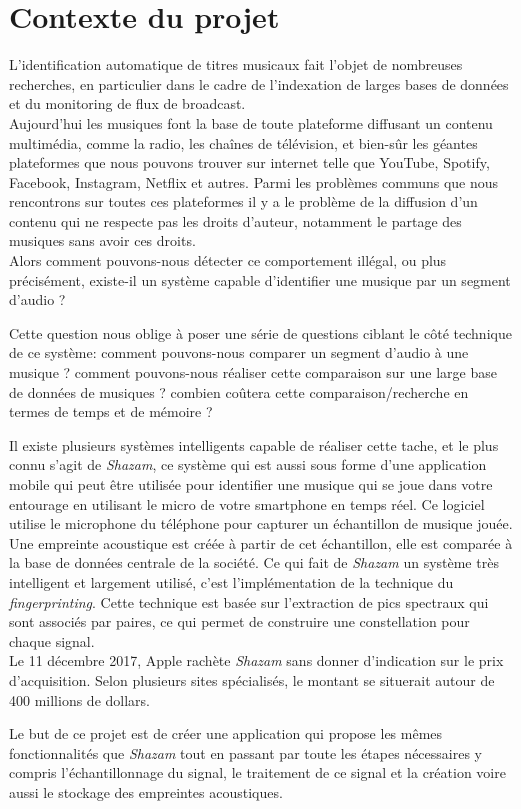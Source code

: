 \documentclass[10pt, report, english]{report}
\begin{document}
\section{Contexte du projet}
L’identification automatique de titres musicaux fait l’objet de nombreuses recherches, en particulier dans le cadre de l’indexation de larges bases de données et du monitoring de flux de broadcast. \\
Aujourd'hui les musiques font la base de toute plateforme diffusant un contenu multimédia, comme la radio, les chaînes de télévision, et bien-sûr les géantes plateformes que nous pouvons trouver sur internet telle que YouTube, Spotify, Facebook, Instagram, Netflix et autres. Parmi les problèmes communs que nous rencontrons sur toutes ces plateformes il y a le problème de la diffusion d'un contenu qui ne respecte pas les droits d'auteur, notamment le partage des musiques sans avoir ces droits.\\
Alors comment pouvons-nous détecter ce comportement illégal, ou plus précisément, existe-il un système capable d'identifier une musique par un segment d'audio ? \\\par
Cette question nous oblige à poser une série de questions ciblant le côté technique de ce système: comment pouvons-nous comparer un segment d'audio à une musique ? comment pouvons-nous réaliser cette comparaison sur une large base de données de musiques ? combien coûtera cette comparaison/recherche en termes de temps et de mémoire ? \\\par
Il existe plusieurs systèmes intelligents capable de réaliser cette tache, et le plus connu s'agit de \textit{Shazam}, ce système qui est aussi sous forme d'une application mobile qui peut être utilisée pour identifier une musique qui se joue dans votre entourage en utilisant le micro de votre smartphone en temps réel. Ce logiciel utilise le microphone du téléphone pour capturer un échantillon de musique jouée. Une empreinte acoustique est créée à partir de cet échantillon, elle est comparée à la base de données centrale de la société. Ce qui fait de \textit{Shazam} un système très intelligent et largement utilisé, c'est l'implémentation de la technique du \textit{fingerprinting}. Cette technique est basée sur l’extraction de pics spectraux qui sont associés par paires, ce qui permet de construire une constellation pour chaque signal. \\
Le 11 décembre 2017, Apple rachète \textit{Shazam} sans donner d'indication sur le prix d'acquisition. Selon plusieurs sites spécialisés, le montant se situerait autour de 400 millions de dollars.\\\par
Le but de ce projet est de créer une application qui propose les mêmes fonctionnalités que \textit{Shazam} tout en passant par toute les étapes nécessaires y compris l'échantillonnage du signal, le traitement de ce signal et la création voire aussi le stockage des empreintes acoustiques.
\end{document}
